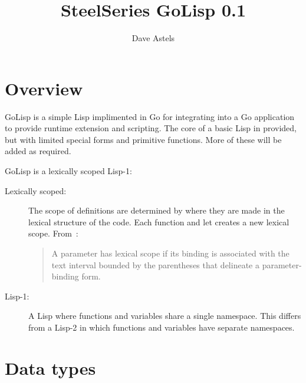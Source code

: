 \documentclass[12pt]{article}
\title{SteelSeries GoLisp 0.1}
\author{Dave Astels}
\begin{document}
\maketitle

\section{Overview}

GoLisp is a simple Lisp implimented in Go for integrating into a Go
application to provide runtime extension and scripting. The core of a
basic Lisp in provided, but with limited special forms and primitive
functions. More of these will be added as required. 

GoLisp is a lexically scoped Lisp-1:

\begin{description}
\item[Lexically scoped:] The scope of definitions are determined by
  where they are made in the lexical structure of the code. Each
  function and let creates a new lexical scope. From~\cite{lisp}:

  \begin{quotation}
    A parameter has lexical scope if its binding is associated with
    the text interval bounded by the parentheses that delineate a
    parameter-binding form.
  \end{quotation}

\item[Lisp-1:] A Lisp where functions and variables share a single
  namespace. This differs from a Lisp-2 in which functions and
  variables have separate namespaces.
\end{description}

\section{Data types}
\end{document}

